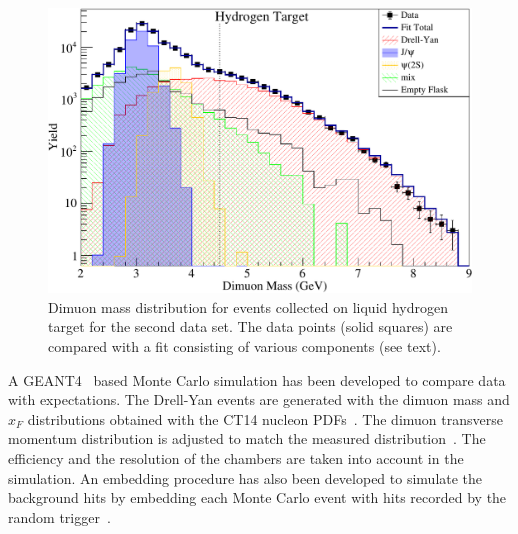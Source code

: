 \documentclass[reprint,aps,unsortedaddress,superscriptaddress,prl,floatfix,showpacs,linenumbers]{revtex4-2}
\begin{document}
\begin{figure}[htbp!]
	\centering
	\includegraphics[width=\linewidth]{massfit_run56_LH2.pdf}
	\caption{Dimuon mass distribution for events collected
		on liquid hydrogen target for the second data set.
		The data points (solid squares) are compared with a fit consisting of
		various components (see text).}
	\label{fig:massfit}
\end{figure}

A GEANT4~\cite{agostinelli2003,allison2006,allison2016} based Monte
Carlo simulation has been developed to compare data with expectations.
The Drell-Yan events are generated with the dimuon mass and $x_F$
distributions obtained with the CT14 nucleon PDFs~\cite{hou2018}.
The dimuon transverse momentum distribution is adjusted to match the measured distribution~\cite{prasad2020,leung2024}.
The efficiency and the resolution of the chambers are taken into account in the simulation.
An embedding procedure has also been developed to simulate the background hits by embedding each Monte Carlo event
with hits recorded by the random trigger~\cite{dove2020}.
\end{document}
